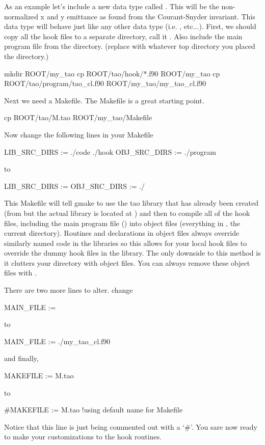 As an example let's include a new data type called . This
will be the non-normalized x and y emittance as found from the Courant-Snyder
invariant. This data type will behave just like any other data type (i.e.
,  etc...). First, we should copy all the hook files to a
separate directory, call it . Also include the main program file
from the  directory.  (replace  with whatever top
directory you placed the  directory.)
\begin{example}
  mkdir ROOT/my_tao
  cp ROOT/tao/hook/*.f90 ROOT/my_tao
  cp ROOT/tao/program/tao_cl.f90 ROOT/my_tao/my_tao_cl.f90
\end{example}
Next we need a Makefile. The  
Makefile is a great starting point.
\begin{example}
  cp ROOT/tao/M.tao ROOT/my_tao/Makefile
\end{example}
Now change the following lines in your Makefile
\begin{example}
  LIB\_SRC\_DIRS := ./code ./hook
  OBJ\_SRC\_DIRS := ./program
\end{example}
to
\begin{example}
  LIB\_SRC\_DIRS :=
  OBJ\_SRC\_DIRS := ./
\end{example}
This Makefile will tell gmake to use the tao library that has already been created (from 
 but the actual library is located at )
 and then to compile
all of the hook files, including the main program file ()
into object files (everything in , the current directory).  Routines and
declarations in object files always override similarly named code in the \tao
libraries so this allows for your local hook files to override the dummy hook
files in the \tao library. The only downside to this method is it clutters your
 directory with object files. You can always remove these object files
with .

There are two more lines to alter. change
\begin{example}
  MAIN\_FILE :=
\end{example}
to
\begin{example}
  MAIN\_FILE := ./my\_tao_cl.f90
\end{example}
and finally,
\begin{example}
  MAKEFILE := M.tao
\end{example}
to
\begin{example}
  #MAKEFILE := M.tao !using default name for Makefile
\end{example}
Notice that this line is just being commented out with a `\#'. You sare now ready
to make your customizations to the hook routines.

